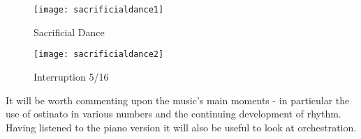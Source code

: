 \begin{figure}[H]
\centering
\texttt{[image: sacrificialdance1]}\caption{Sacrificial Dance}
\label{fig:sacrificialdance1}
\end{figure}

\begin{figure}[H]
\centering
\texttt{[image: sacrificialdance2]}\caption{Interruption 5/16}
\label{fig:sacrificialdance2}
\end{figure}

It will be worth commenting upon the music's main moments - in particular the use of ostinato in various numbers and the continuing development of rhythm. Having listened to the piano version it will also be useful to look at orchestration. 




